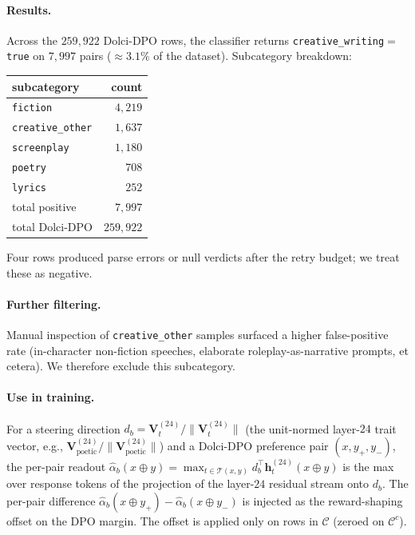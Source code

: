 \documentclass{article} %
\begin{document}
\paragraph{Results.}
Across the $259{,}922$ Dolci-DPO rows, the classifier returns
\texttt{creative\_writing}$=$\texttt{true} on $7{,}997$ pairs
($\approx 3.1\%$ of the dataset). Subcategory breakdown:

\begin{center}
\begin{tabular}{lr}
\toprule
subcategory & count \\
\midrule
\texttt{fiction}         & $4{,}219$ \\
\texttt{creative\_other} & $1{,}637$ \\
\texttt{screenplay}      & $1{,}180$ \\
\texttt{poetry}          & $708$    \\
\texttt{lyrics}          & $252$    \\
\midrule
total positive          & $7{,}997$ \\
total Dolci-DPO         & $259{,}922$ \\
\bottomrule
\end{tabular}
\end{center}

Four rows produced parse errors or null verdicts after the retry
budget; we treat these as negative.

\paragraph{Further filtering.}
Manual inspection of \texttt{creative\_other} samples surfaced a higher
false-positive rate (in-character non-fiction speeches, elaborate
roleplay-as-narrative prompts, et cetera). We therefore exclude this
subcategory.

\paragraph{Use in training.}
For a steering direction
$d_b = \mathbf{V}_t^{(24)} / \|\mathbf{V}_t^{(24)}\|$
(the unit-normed layer-$24$ trait vector, e.g.,
$\mathbf{V}_{\text{poetic}}^{(24)} / \|\mathbf{V}_{\text{poetic}}^{(24)}\|$)
and a Dolci-DPO preference pair $(x, y_+, y_-)$, the per-pair readout
$\widehat{\alpha}_b(x{\oplus}y) =
\max_{t \in \mathcal{T}(x,y)} d_b^{\top} \mathbf{h}_t^{(24)}(x{\oplus}y)$
is the max over response tokens of the projection of the layer-$24$
residual stream onto $d_b$. The per-pair difference
$\widehat{\alpha}_b(x{\oplus}y_+) - \widehat{\alpha}_b(x{\oplus}y_-)$
is injected as the reward-shaping offset on the DPO margin. The offset
is applied only on rows in $\mathcal{C}$ (zeroed on $\mathcal{C}^c$).
\end{document}
